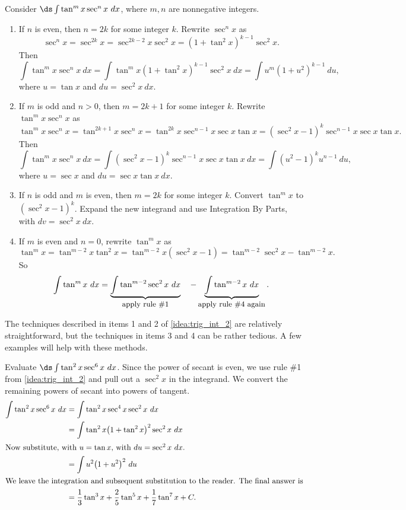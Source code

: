 {
\begin{keyidea}\label{idea:trig_int_2}
Consider $\ds\int\tan^mx\sec^nx\ dx$, where $m,n$ are nonnegative integers.
\begin{enumerate}
\item		If $n$ is even, then $n=2k$ for some integer $k$. Rewrite $\sec^nx$ as 
\[\sec^nx = \sec^{2k}x = \sec^{2k-2}x\sec^2x = (1+\tan^2x)^{k-1}\sec^2x.\]
Then
\[
\int\tan^mx\sec^nx\ dx=\int\tan^mx(1+\tan^2x)^{k-1}\sec^2x\ dx = \int u^m(1+u^2)^{k-1}\ du,
\]
where $u = \tan x$ and $du = \sec^2x\ dx$.

\item		If $m$ is odd and $n>0$, then $m=2k+1$ for some integer $k$. Rewrite $\tan^mx\sec^nx$ as
\[
\tan^mx\sec^nx = \tan^{2k+1}x\sec^nx = \tan^{2k}x\sec^{n-1}x\sec x\tan x = (\sec^2x-1)^k\sec^{n-1}x\sec x\tan x.
\]
Then
\[
\int\tan^mx\sec^nx\ dx=\int(\sec^2x-1)^k\sec^{n-1}x\sec x\tan x\ dx = \int(u^2-1)^ku^{n-1}\ du,
\]
where $u = \sec x$ and $du = \sec x\tan x\ dx$.

\item If $n$ is odd and $m$ is even, then $m=2k$ for some integer $k$. Convert $\tan^mx $ to $(\sec^2x-1)^k$. Expand the new integrand and use Integration By Parts, with $dv = \sec^2x\ dx$.

\item		If $m$ is even and $n=0$, rewrite $\tan^mx$ as
\[
\tan^mx = \tan^{m-2}x\tan^2x = \tan^{m-2}x(\sec^2x-1) = \tan^{m-2}\sec^2x-\tan^{m-2}x.
\]
So
\[
\int\tan^mx\ dx = \underbrace{\int\tan^{m-2}\sec^2x\ dx}_{\text{\small apply rule \#1}}\quad - \underbrace{\int\tan^{m-2}x\ dx}_{\text{\small apply rule \#4 again}}.
\]

\end{enumerate}
\end{keyidea}
}

The techniques described in items 1 and 2 of \autoref{idea:trig_int_2} are relatively straightforward, but the techniques in items 3 and 4 can be rather tedious. A few examples will help with these methods.

\begin{example}\label{ex_trigint5}
Evaluate $\ds\int \tan^2x\sec^6x\ dx$.
\solution
Since the power of secant is even, we use rule \#1 from \autoref{idea:trig_int_2} and pull out a $\sec^2x$ in the integrand. We convert the remaining powers of secant into powers of tangent.
\begin{align*}
\int \tan^2x\sec^6x\ dx &= \int\tan^2x\sec^4x\sec^2x\ dx \\
		&= \int \tan^2x\big(1+\tan^2x\big)^2\sec^2x\ dx \\
\intertext{Now substitute, with $u=\tan x$, with $du = \sec^2x\ dx$.}
		&=\int u^2\big(1+u^2\big)^2\ du\\
\intertext{We leave the integration and subsequent substitution to the reader. The final answer is}
		&=\frac13\tan^3x+\frac25\tan^5x+\frac17\tan^7x+C.
\end{align*}
\end{example}


